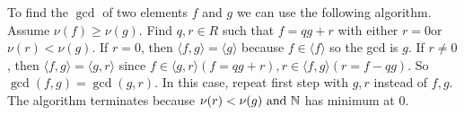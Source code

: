 \begin{theorem}
    To find the \(\gcd\) of two elements \(f\) and \(g\) we can use the following algorithm.  Assume \(\nu(f) \geq \nu(g)\). Find \(q, r \in R\) such that \(f = qg + r\) with either \(r = 0\)or \(\nu(r) < \nu(g)\). If \(r = 0\), then \(\langle f, g \rangle = \langle g \rangle\) because \(f \in \langle f \rangle\) so the gcd is \(g\). If \(r \neq 0\), then \(\langle f, g \rangle = \langle g, r \rangle\) since \(f \in \langle g, r \rangle (f = qg + r), r \in \langle f, g \rangle (r = f -qg)\). So \(\gcd(f, g) = \gcd(g, r)\). In this case, repeat first step with \(g, r\) instead of \(f, g\). The algorithm terminates because \(\nu(r) < \nu(g) \text{ and } \mathbb{N}\) has minimum at 0.
\end{theorem}


